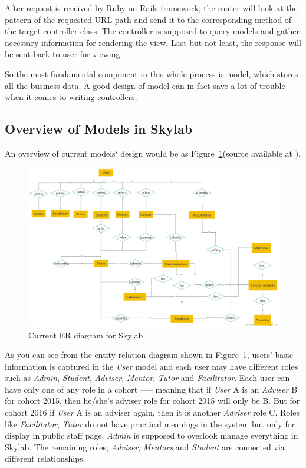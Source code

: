 After request is received by Ruby on Rails framework, the router will look at the pattern of the requested URL path and send it to the corresponding method of the target controller class. The controller is supposed to query models and gather necessary information for rendering the view. Last but not least, the response will be sent back to user for viewing.

So the most fundamental component in this whole process is model, which stores all the business data. A good design of model can in fact save a lot of trouble when it comes to writing controllers.

\subsection{Overview of Models in Skylab}

An overview of current models` design would be as Figure~\ref{fig:SkylabER}(source available at \cite{citationERSource}).

\begin{figure}[h]
  \centering
  \includegraphics[width=\textwidth]{Images/Skylab_ER.png}
  \caption{Current ER diagram for Skylab}
  \label{fig:SkylabER}
\end{figure}

As you can see from the entity relation diagram shown in Figure~\ref{fig:SkylabER}, users' basic information is captured in the \textit{User} model and each user may have different roles such as \textit{Admin}, \textit{Student}, \textit{Adviser}, \textit{Mentor}, \textit{Tutor} and \textit{Facilitator}. Each user can have only one of any role in a cohort —-- meaning that if \textit{User} A is an \textit{Adviser} B for cohort 2015, then he/she's adviser role for cohort 2015 will only be B. But for cohort 2016 if \textit{User} A is an adviser again, then it is another \textit{Adviser} role C. Roles like \textit{Facilitator}, \textit{Tutor} do not have practical meanings in the system but only for display in public staff page. \textit{Admin} is supposed to overlook manage everything in Skylab. The remaining roles, \textit{Adviser}, \textit{Mentors} and \textit{Student} are connected via different relationships.

